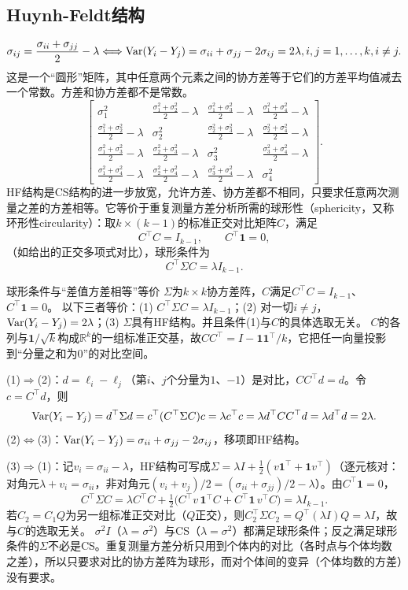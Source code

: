 \subsection{Huynh-Feldt结构}\label{sec:hf}
\[
\sigma_{ij}=\frac{\sigma_{ii}+\sigma_{jj}}2-\lambda
\Longleftrightarrow
\operatorname{Var}(Y_i-Y_j)=\sigma_{ii}+\sigma_{jj}-2\sigma_{ij}=2\lambda,
 i,j=1,\ldots,k, i\ne j.
\]
这是一个“圆形”矩阵，其中任意两个元素之间的协方差等于它们的方差平均值减去一个常数。方差和协方差都不是常数。
\[
\begin{bmatrix}
\sigma_1^2&\frac{\sigma_1^2+\sigma_2^2}2-\lambda&\frac{\sigma_1^2+\sigma_3^2}2-\lambda&\frac{\sigma_1^2+\sigma_4^2}2-\lambda\\[4pt]
\frac{\sigma_1^2+\sigma_2^2}2-\lambda&\sigma_2^2&\frac{\sigma_2^2+\sigma_3^2}2-\lambda&\frac{\sigma_2^2+\sigma_4^2}2-\lambda\\[4pt]
\frac{\sigma_1^2+\sigma_3^2}2-\lambda&\frac{\sigma_2^2+\sigma_3^2}2-\lambda&\sigma_3^2&\frac{\sigma_3^2+\sigma_4^2}2-\lambda\\[4pt]
\frac{\sigma_1^2+\sigma_4^2}2-\lambda&\frac{\sigma_2^2+\sigma_4^2}2-\lambda&\frac{\sigma_3^2+\sigma_4^2}2-\lambda&\sigma_4^2
\end{bmatrix}.
\]
HF结构是CS结构的进一步放宽，允许方差、协方差都不相同，只要求任意两次测量之差的方差相等。它等价于重复测量方差分析所需的球形性（sphericity，又称环形性circularity）：取$k\times(k-1)$的标准正交对比矩阵$C$，满足
\[
C^\top C=I_{k-1},\qquad C^\top\mathbf 1=0,
\]
（如给出的正交多项式对比），球形条件为
\[
C^\top\Sigma C=\lambda I_{k-1}.
\]
\begin{derivation}{球形条件与“差值方差相等”等价}
$\Sigma$为$k\times k$协方差阵，$C$满足$C^\top C=I_{k-1}$、$C^\top\mathbf 1=0$。
以下三者等价：(1) $C^\top\Sigma C=\lambda I_{k-1}$；(2) 对一切$i\ne j$，$\operatorname{Var}(Y_i-Y_j)=2\lambda$；(3) $\Sigma$具有HF结构。并且条件(1)与$C$的具体选取无关。
$C$的各列与$\mathbf 1/\sqrt k$构成$\mathbb R^k$的一组标准正交基，故$CC^\top=I-\mathbf 1\mathbf 1^\top/k$，它把任一向量投影到“分量之和为0”的对比空间。

(1)$\Rightarrow$(2)：$d=\ell_i-\ell_j$（第$i$、$j$个分量为$1$、$-1$）是对比，$CC^\top d=d$。令$c=C^\top d$，则
\[
\operatorname{Var}(Y_i-Y_j)=d^\top\Sigma d=c^\top(C^\top\Sigma C)c=\lambda c^\top c=\lambda d^\top CC^\top d=\lambda d^\top d=2\lambda .
\]
(2)$\Leftrightarrow$(3)：$\operatorname{Var}(Y_i-Y_j)=\sigma_{ii}+\sigma_{jj}-2\sigma_{ij}$，移项即HF结构。

(3)$\Rightarrow$(1)：记$v_i=\sigma_{ii}-\lambda$，HF结构可写成$\Sigma=\lambda I+\frac12(v\mathbf 1^\top+\mathbf 1v^\top)$（逐元核对：对角元$\lambda+v_i=\sigma_{ii}$，非对角元$(v_i+v_j)/2=(\sigma_{ii}+\sigma_{jj})/2-\lambda$）。由$C^\top\mathbf 1=0$，
\[
C^\top\Sigma C=\lambda C^\top C+\tfrac12\bigl(C^\top v\,\mathbf 1^\top C+C^\top\mathbf 1\,v^\top C\bigr)=\lambda I_{k-1}.
\]
若$C_2=C_1Q$为另一组标准正交对比（$Q$正交），则$C_2^\top\Sigma C_2=Q^\top(\lambda I)Q=\lambda I$，故与$C$的选取无关。
$\sigma^2I$（$\lambda=\sigma^2$）与CS（$\lambda=\sigma^2$）都满足球形条件；反之满足球形条件的$\Sigma$不必是CS。重复测量方差分析只用到个体内的对比（各时点与个体均数之差），所以只要求对比的协方差阵为球形，而对个体间的变异（个体均数的方差）没有要求。
\end{derivation}

